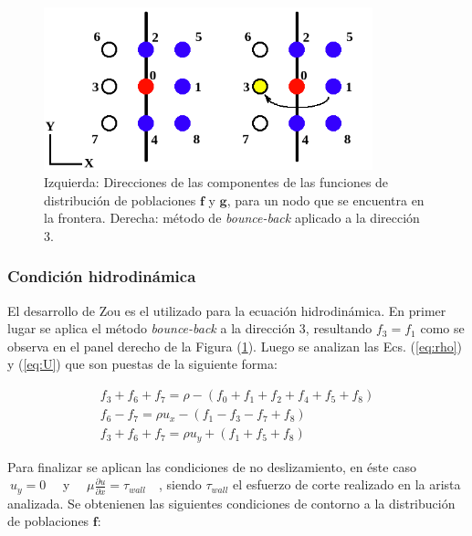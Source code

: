 \begin{figure}[h!]
	\centering
	\includegraphics[width=0.85\textwidth]{figs/cap2/CC_hidrodinamica.png}
	\caption{Izquierda: Direcciones de las componentes de las funciones de distribución de poblaciones $\mathbf{f}$ y $\mathbf{g}$, para un nodo que se encuentra en la frontera. Derecha: método de \textit{bounce-back} aplicado a la dirección 3.}
	\label{fig:CC_hidro}
\end{figure}




\subsubsection{Condición hidrodinámica}

El desarrollo de Zou \cite{zou1997pressure} es el utilizado para la ecuación hidrodinámica. En primer lugar se aplica el método \textit{bounce-back} a la dirección 3, resultando $f_{3} = f_{1}$ como se observa en el panel derecho de la Figura (\ref{fig:CC_hidro}). Luego se analizan las Ecs. (\ref{eq:rho}) y (\ref{eq:U}) que son puestas de la siguiente forma:

\begin{equation}
	\begin{array}{c}
	f_{3} + f_{6} + f_{7} = \rho - \left( f_{0} + f_{1} + f_{2} + f_{4} + f_{5} + f_{8}	 \right)\\
	f_{6} - f_{7} = \rho u_{x} - \left( f_{1} - f_{3} - f_{7} + f_{8} 	 \right)\\
	f_{3} + f_{6} + f_{7} = \rho u_{y} + \left( f_{1} + f_{5} + f_{8} \right)
	\end{array}
\end{equation}

Para finalizar se aplican las condiciones de no deslizamiento, en éste caso $\> u_{y} = 0\quad$ y $\quad\mu \frac{\partial u}{\partial x} = \tau_{wall}\quad$, siendo $\tau_{wall}$ el esfuerzo de corte realizado en la arista analizada. Se obtenienen las siguientes condiciones de contorno a la distribución de poblaciones $\mathbf{f}$:

